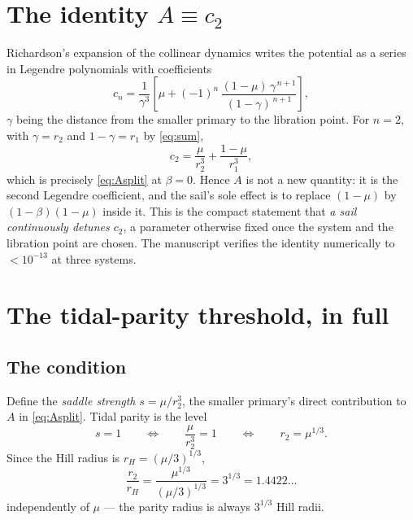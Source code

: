 \documentclass[11pt,a4paper]{article}
\begin{document}
\section{The identity \texorpdfstring{$A\equiv c_2$}{A = c2}}\label{sec:c2}

Richardson's expansion of the collinear dynamics writes the potential as a
series in Legendre polynomials with coefficients
\begin{equation}
  c_n = \frac{1}{\gamma^3}\left[\mu
        + (-1)^n\,\frac{(1-\mu)\,\gamma^{\,n+1}}{(1-\gamma)^{\,n+1}}\right],
\end{equation}
$\gamma$ being the distance from the smaller primary to the libration point.
For $n=2$, with $\gamma=r_2$ and $1-\gamma=r_1$ by \eqref{eq:sum},
\begin{equation}
  c_2 = \frac{\mu}{r_2^3} + \frac{1-\mu}{r_1^3},
\end{equation}
which is precisely \eqref{eq:Asplit} at $\beta=0$. Hence $A$ is not a new
quantity: it is the second Legendre coefficient, and the sail's sole effect is
to replace $(1-\mu)$ by $(1-\beta)(1-\mu)$ inside it. This is the compact
statement that \emph{a sail continuously detunes $c_2$}, a parameter otherwise
fixed once the system and the libration point are chosen. The manuscript
verifies the identity numerically to $<10^{-13}$ at three systems.

\section{The tidal-parity threshold, in full}\label{sec:closed}

\subsection{The condition}

Define the \emph{saddle strength} $s=\mu/r_2^3$, the smaller primary's direct
contribution to $A$ in \eqref{eq:Asplit}. Tidal parity is the level
\begin{equation}
  s = 1
  \qquad\Longleftrightarrow\qquad
  \frac{\mu}{r_2^3}=1
  \qquad\Longleftrightarrow\qquad
  r_2 = \mu^{1/3} .
  \label{eq:parity}
\end{equation}
Since the Hill radius is $r_H=(\mu/3)^{1/3}$,
\begin{equation}
  \frac{r_2}{r_H} = \frac{\mu^{1/3}}{(\mu/3)^{1/3}} = 3^{1/3} = 1.4422\ldots
\end{equation}
independently of $\mu$ --- the parity radius is always $3^{1/3}$ Hill radii.
\end{document}
